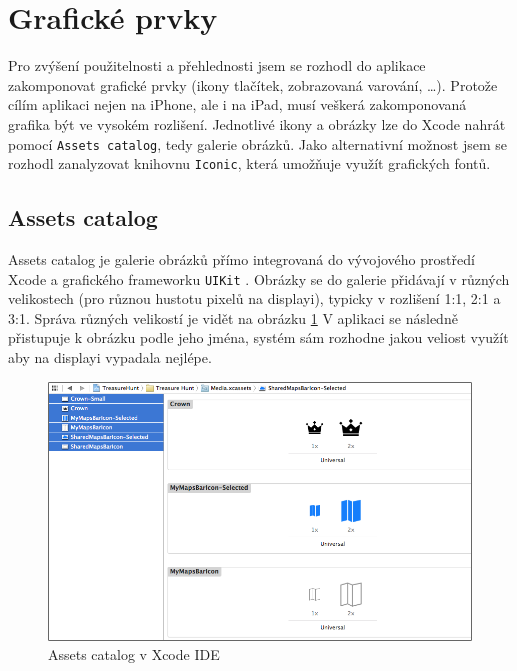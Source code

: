 \section{Grafické prvky}\label{analyza-graficke-prvky}

Pro zvýšení použitelnosti a přehlednosti jsem se rozhodl do aplikace zakomponovat grafické prvky (ikony tlačítek, zobrazovaná varování, \ldots).
Protože cílím aplikaci nejen na iPhone, ale i na iPad, musí veškerá zakomponovaná grafika být ve vysokém rozlišení.
Jednotlivé ikony a obrázky lze do Xcode nahrát pomocí \texttt{Assets catalog}, tedy galerie obrázků.
Jako alternativní možnost jsem se rozhodl zanalyzovat knihovnu \texttt{Iconic}, která umožňuje využít grafických fontů.

\subsection{Assets catalog}

Assets catalog je galerie obrázků přímo integrovaná do vývojového prostředí Xcode a grafického frameworku \texttt{UIKit} \cite{apple-xcode-assets-catalog}.
Obrázky se do galerie přidávají v různých velikostech (pro různou hustotu pixelů na displayi), typicky v rozlišení 1:1, 2:1 a 3:1.
Správa různých velikostí je vidět na obrázku \ref{fig:xcode-assets-catalog}
V aplikaci se následně přistupuje k obrázku podle jeho jména, systém sám rozhodne jakou veliost využít aby na displayi vypadala nejlépe.

\begin{figure}\centering
	\includegraphics[width=\textwidth]{assets/analysis-graphics-assets-catalog.png}
	\caption{Assets catalog v Xcode IDE \cite{rw-update-app-for-ios7}}\label{fig:xcode-assets-catalog}
\end{figure}

